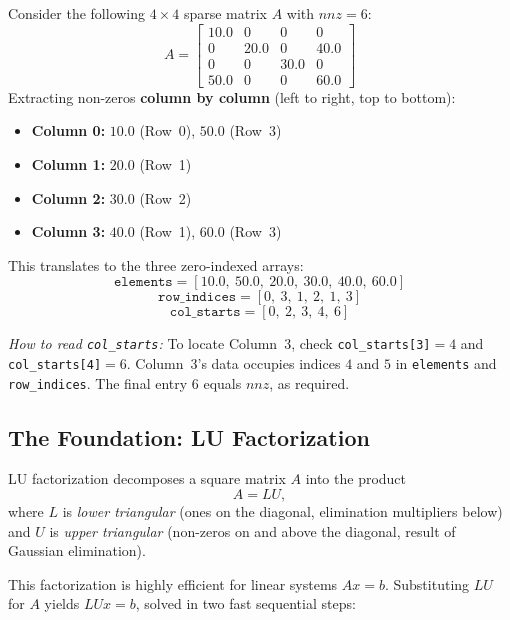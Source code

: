 \documentclass[11pt, a4paper]{article}
\begin{document}
\begin{example}
Consider the following $4\times 4$ sparse matrix $A$ with $nnz = 6$:
\[
A = \begin{bmatrix}
10.0 & 0    & 0    & 0    \\
0    & 20.0 & 0    & 40.0 \\
0    & 0    & 30.0 & 0    \\
50.0 & 0    & 0    & 60.0
\end{bmatrix}
\]
Extracting non-zeros \textbf{column by column} (left to right, top to bottom):
\begin{itemize}[itemsep=1pt]
    \item \textbf{Column 0:} $10.0$ (Row~0), $50.0$ (Row~3)
    \item \textbf{Column 1:} $20.0$ (Row~1)
    \item \textbf{Column 2:} $30.0$ (Row~2)
    \item \textbf{Column 3:} $40.0$ (Row~1), $60.0$ (Row~3)
\end{itemize}

This translates to the three zero-indexed arrays:
\[
\texttt{elements} = [10.0,\ 50.0,\ 20.0,\ 30.0,\ 40.0,\ 60.0]
\]
\[
\texttt{row\_indices} = [0,\ 3,\ 1,\ 2,\ 1,\ 3]
\]
\[
\texttt{col\_starts} = [0,\ 2,\ 3,\ 4,\ 6]
\]

\medskip\noindent\textit{How to read \texttt{col\_starts}:} To locate Column~3, check \texttt{col\_starts[3]}$=4$ and \texttt{col\_starts[4]}$=6$. Column~3's data occupies indices $4$ and $5$ in \texttt{elements} and \texttt{row\_indices}. The final entry $6$ equals $nnz$, as required.
\end{example}

\subsection{The Foundation: LU Factorization}

\begin{definition}[LU Decomposition]
LU factorization decomposes a square matrix $A$ into the product
\[
A = LU,
\]
where $L$ is \emph{lower triangular} (ones on the diagonal, elimination multipliers below) and $U$ is \emph{upper triangular} (non-zeros on and above the diagonal, result of Gaussian elimination).
\end{definition}

\noindent This factorization is highly efficient for linear systems $Ax = b$. Substituting $LU$ for $A$ yields $LUx = b$, solved in two fast sequential steps:
\end{document}

